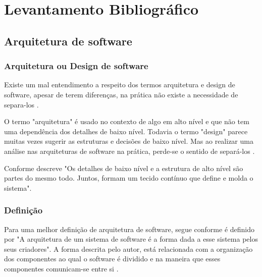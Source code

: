 \chapter{Levantamento Bibliográfico}
\section{Arquitetura de software}
    
    \subsection{Arquitetura ou Design de software}
    
        \par Existe um mal entendimento a respeito dos termos arquitetura e design de software, apesar de terem diferenças, na prática não existe a necessidade de separa-los \cite{livro:martin:cleanarch}.
        
        \par O termo "arquitetura"\hspace{0.1cm} é usado no contexto de algo em alto nível e que não tem uma dependência dos detalhes de baixo nível. Todavia o termo "design"\hspace{0.1cm} parece muitas vezes sugerir as estruturas e decisões de baixo nível. Mas ao realizar uma análise nas arquiteturas de software na prática, perde-se o sentido de separá-los \cite{livro:martin:cleanarch}.
    
        \par Conforme descreve  "Os detalhes de baixo nível e a estrutura de alto nível são partes do mesmo todo. Juntos, formam um tecido contínuo que define e molda o sistema".
        
        
    \subsection{Definição}
    
        \par Para uma melhor definição de arquitetura de software, segue conforme é definido por  "A arquitetura de um sistema de software é a forma dada a esse sistema pelos seus criadores". A forma descrita pelo autor, está relacionada com a organização dos componentes ao qual o software é dividido e na maneira que esses componentes comunicam-se entre si \cite{livro:martin:cleanarch}.
        
